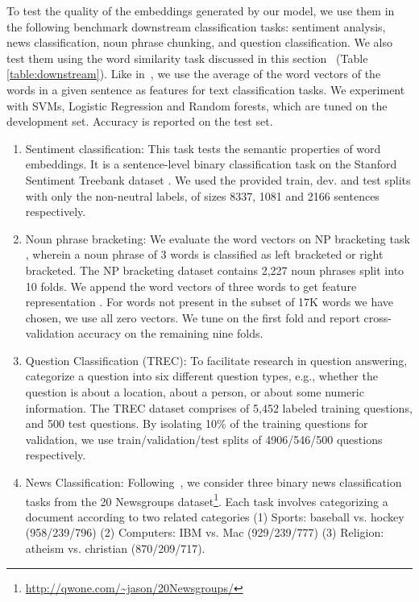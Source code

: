 \documentclass[letterpaper]{article} %
\begin{document}
To test the quality of the embeddings generated by our model, we use them in the following benchmark downstream classification tasks: sentiment analysis, news classification, noun phrase chunking, and question classification. We also test them using the word similarity task discussed in this section~
(Table \ref{table:downstream}). Like in~\cite{faruqui2015sparse}, we use the average of the word vectors of the words in a given sentence as features for text classification tasks. We experiment with SVMs, Logistic Regression and Random forests, which are tuned on the development set. Accuracy is reported on the test set.

\begin{enumerate}

\item  Sentiment classification: This task tests the semantic properties of word embeddings. It is a sentence-level binary classification task on the Stanford Sentiment Treebank dataset \cite{socher2013recursive}. We used the provided train, dev. and test splits with only the non-neutral labels, of sizes 8337, 1081 and 2166 sentences respectively.

\item Noun phrase bracketing: We evaluate the word vectors on NP bracketing task \cite{lazaridou2013fish}, wherein a noun phrase of 3 words is classified as left bracketed or right bracketed. The NP bracketing dataset contains 2,227 noun phrases split into 10 folds. 
We append the word vectors of three words to get feature representation \cite{faruqui2015sparse}. For words not present in the subset of 17K words we have chosen, we use all zero vectors. We tune on the first fold and report cross-validation accuracy on the remaining nine folds. 

\item Question Classification (TREC): To facilitate research in question answering, \cite{li2006learning} categorize a question into six different question types, e.g., whether the question is about a location, about a person, or about some numeric information. The TREC dataset comprises of 5,452 labeled training questions, and 500 test questions. By isolating 10\% of the training questions for validation, we use train/validation/test splits of 4906/546/500 questions respectively. 

\item News Classification: Following~\cite{faruqui2015sparse}, we consider three binary
news classification tasks from the 20 Newsgroups dataset\footnote{\url{http://qwone.com/~jason/20Newsgroups/}}. Each task involves categorizing a document according to two related categories (1) Sports: baseball vs. hockey (958/239/796) (2) Computers: IBM vs. Mac (929/239/777) (3) Religion: atheism vs. christian (870/209/717).


\end{enumerate}
\end{document}
